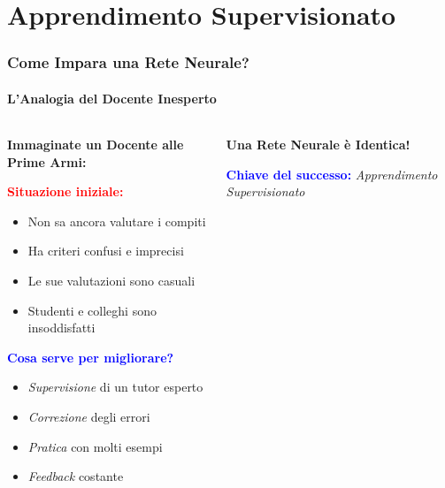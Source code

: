 \documentclass[aspectratio=169]{beamer}
\begin{document}
\section{Apprendimento Supervisionato}
%
%
\begin{frame}
\frametitle{Come Impara una Rete Neurale?}
\framesubtitle{L'Analogia del Docente Inesperto}

\begin{columns}
\begin{column}{0.5\textwidth}
\textbf{Immaginate un Docente alle Prime Armi:}

\vspace{0.3cm}
\textcolor{red}{\textbf{Situazione iniziale:}}
\begin{itemize}
    \item Non sa ancora valutare i compiti
    \item Ha criteri confusi e imprecisi
    \item Le sue valutazioni sono casuali
    \item Studenti e colleghi sono insoddisfatti
\end{itemize}

\vspace{0.3cm}
\textcolor{blue}{\textbf{Cosa serve per migliorare?}}
\begin{itemize}
    \item \textit{Supervisione} di un tutor esperto
    \item \textit{Correzione} degli errori
    \item \textit{Pratica} con molti esempi
    \item \textit{Feedback} costante
\end{itemize}
\end{column}

\begin{column}{0.5\textwidth}
\begin{center}
\textbf{Una Rete Neurale è Identica!}

\vspace{0.3cm}

\vspace{0.5cm}
\textcolor{blue}{\textbf{Chiave del successo:}} 
\textit{Apprendimento Supervisionato}
\end{center}
\end{column}
\end{columns}

\end{frame}
\end{document}
